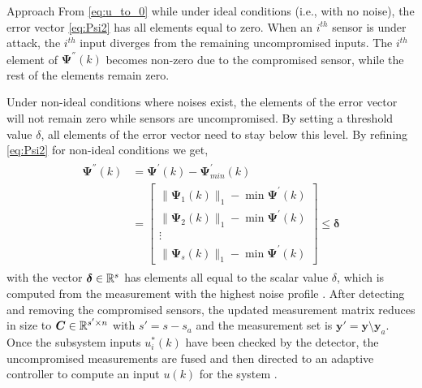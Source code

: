 \begin{section}{Approach}
From \eqref{eq:u_to_0} while under ideal conditions (i.e., with no noise), the error vector \eqref{eq:Psi2} has all elements equal to zero. When an $i^{th}$ sensor is under attack, the $i^{th}$ input diverges from the remaining uncompromised inputs. The $i^{th}$ element of $\bm{\Psi}^{''}(k)$ becomes non-zero due to the compromised sensor, while the rest of the elements remain zero. 

Under non-ideal conditions where noises exist, the elements of the error vector will not remain zero while sensors are uncompromised. By setting a threshold value $\delta$, all elements of the error vector need to stay below this level. By refining \eqref{eq:Psi2} for non-ideal conditions we get,
    \begin{align}
    \begin{split}
    \label{eq:Psi2_nonideal}
	\bm{\Psi^{''}}(k)&=\bm{\Psi^{'}}(k)-\bm{\Psi}^{'}_{min}(k) \\
	& =\begin{bmatrix} \lVert{\bm{\Psi}_1(k)}\rVert_1 - \min \bm{\Psi}^{'}(k)\\ \lVert{\bm{\Psi}_2(k)}\rVert_1 - \min \bm{\Psi}^{'}(k) \\ \vdots \\ \lVert{\bm{\Psi}_s(k)}\rVert_1 - \min \bm{\Psi}^{'}(k) \end{bmatrix} \leq \bm{\delta}
	\end{split}
	\end{align}
with the vector $\bm{\delta} \in \mathbb{R}^s$ has elements all equal to the scalar value $\delta$, which is computed from the measurement with the highest noise profile . After detecting and removing the compromised sensors, the updated measurement matrix reduces in size to $\bm{C} \in \mathbb{R}^{s' \times n}$ with $s'=s-s_a$ and the measurement set is $\bm{y}' =\bm{y}\setminus\bm{y}_a$. Once the subsystem inputs $u_i^*(k)$ have been checked by the detector, the uncompromised measurements are fused and then directed to an adaptive controller to compute an input $u(k)$ for the system .


	


\end{section}
